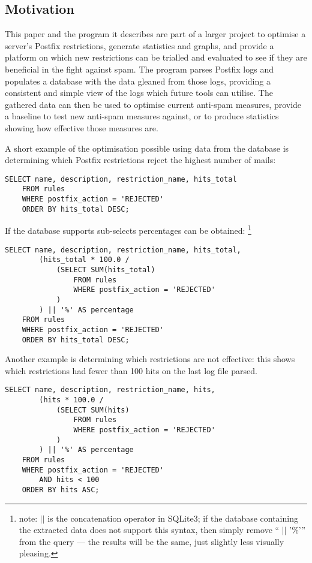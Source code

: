 \documentclass[a4paper,12pt,draft]{article}
\begin{document}
\subsection{Motivation}

\label{motivation}

This paper and the program it describes are part of a larger project to
optimise a server's Postfix restrictions, generate statistics and graphs,
and provide a platform on which new restrictions can be trialled and
evaluated to see if they are beneficial in the fight against spam.  The
program parses Postfix logs and populates a database with the data gleaned
from those logs, providing a consistent and simple view of the logs which
future tools can utilise.  The gathered data can then be used to optimise
current anti-spam measures, provide a baseline to test new anti-spam
measures against, or to produce statistics showing how effective those
measures are.

A short example of the optimisation possible using data from the database
is determining which Postfix restrictions reject the highest number of
mails:

\begin{verbatim}
SELECT name, description, restriction_name, hits_total
    FROM rules
    WHERE postfix_action = 'REJECTED'
    ORDER BY hits_total DESC;
\end{verbatim}

If the database supports sub-selects percentages can be obtained:
\footnote{\SQL{} note: $||$ is the concatenation operator in SQLite3; if
the database containing the extracted data does not support this syntax,
then simply remove `` $||$ '$\%$'\hspace{1ex}'' from the query --- the
results will be the same, just slightly less visually pleasing.}

\begin{verbatim}
SELECT name, description, restriction_name, hits_total,
        (hits_total * 100.0 /
            (SELECT SUM(hits_total)
                FROM rules
                WHERE postfix_action = 'REJECTED'
            )
        ) || '%' AS percentage
    FROM rules
    WHERE postfix_action = 'REJECTED'
    ORDER BY hits_total DESC;
\end{verbatim}

Another example is determining which restrictions are not effective: this
shows which restrictions had fewer than 100 hits on the last log file
parsed.

\begin{verbatim}
SELECT name, description, restriction_name, hits,
        (hits * 100.0 /
            (SELECT SUM(hits)
                FROM rules
                WHERE postfix_action = 'REJECTED'
            )
        ) || '%' AS percentage
    FROM rules
    WHERE postfix_action = 'REJECTED'
        AND hits < 100
    ORDER BY hits ASC;
\end{verbatim}
\end{document}

